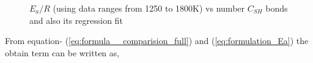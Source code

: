 \documentclass[preprint,12pt]{elsarticle}
\begin{document}
		\begin{figure}[H]\label{fig:Ea_Half}
			{
				\centering
				\caption{$E_a/R$ (using data ranges from 1250 to 1800K) vs number $C_{SH}$ bonds and also its regression fit}
			}
		\end{figure}
		
			From equation- (\ref{eq:formula__comparision_full}) and (\ref{eq:formulation_Ea}) the obtain term can be written as,
			
\end{document}
